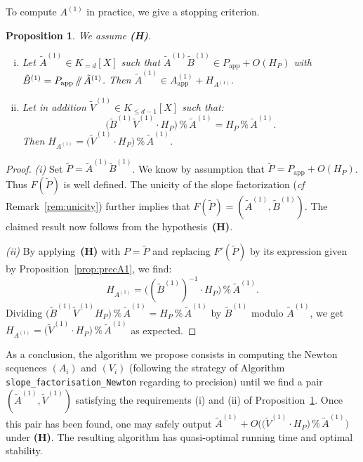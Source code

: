 \documentclass{sig-alternate-05-2015}
\renewcommand{\mod}{\,\%\,}
\renewcommand{\div}{\,/\hspace{-0.3em}/\,}
\newcommand{\app}{\textrm{app}}
\newtheorem{prop}[theo]{Proposition}
\theoremstyle{definition}
\begin{document}
To compute $A^{(1)}$ in practice, we give a stopping criterion.

\begin{prop}
\label{prop:stop}
We assume \textbf{(H)}. 

\vspace{-1mm}

\begin{enumerate}[(i)]
\item Let $\tilde A^{(1)} \in K_{=d}[X]$ such that
$\tilde A^{(1)} \tilde B^{(1)} \in P_\app + O(H_P)$ with
$\tilde B^{(1)} = P_\app \div \tilde A^{(1)}$.
Then $\tilde A^{(1)} \in A_\app^{(1)} + H_{A^{(1)}}$.
\vspace{-1mm}
\item Let in addition $\tilde V^{(1)} \in K_{\leq d{-}1}[X]$ such that:
$$\big(\tilde B^{(1)} \tilde V^{(1)} \cdot H_P\big) \mod \tilde A^{(1)}
= H_P \mod \tilde A^{(1)}.$$
Then $H_{A^{(1)}} = \big(\tilde V^{(1)} \cdot H_P\big) \mod \tilde A^{(1)}$.
\end{enumerate}
\end{prop}

\begin{proof}
\emph{(i)} 
Set $\tilde P = \tilde A^{(1)} \tilde B^{(1)}$. We know by assumption
that $\tilde P = P_\app + O(H_P)$. Thus $F(\tilde P)$ is well defined.
The unicity of the slope factorization (\emph{cf} 
Remark~\ref{rem:unicity}) further implies that $F(\tilde P) = 
(\tilde A^{(1)}, \tilde B^{(1)})$. The claimed result now follows from
the hypothesis~\textbf{(H)}.

\emph{(ii)} By applying~\textbf{(H)} with $P = \tilde P$ and replacing 
$F'(\tilde P)$ by its expression given by Proposition~\ref{prop:precA1}, 
we find:
$$H_{A^{(1)}} = \big((\tilde B^{(1)})^{-1} \cdot H_P\big) \mod \tilde A^{(1)}.$$
Dividing $\big(\tilde B^{(1)} \tilde V^{(1)} H_P\big) \mod \tilde 
A^{(1)} = H_P \mod \tilde A^{(1)}$ by $\tilde B^{(1)}$ modulo $\tilde
A^{(1)}$, we get
$H_{A^{(1)}} = \big(\tilde V^{(1)} \cdot H_P\big) \mod \tilde A^{(1)}$
as expected.
\end{proof}

As a conclusion, the algorithm we propose consists in computing the 
Newton sequences $(A_i)$ and $(V_i)$ (following the strategy of
Algorithm \texttt{slope\_factorisation\_Newton} regarding to precision)
until we find a pair $(\tilde A^{(1)}, \tilde V^{(1)})$ satisfying 
the requirements (i) and (ii) of Proposition~\ref{prop:stop}. Once this 
pair has been found, one may safely output $\tilde A^{(1)} + 
O\big(\big(\tilde V^{(1)} \cdot H_P\big) \mod \tilde A^{(1)}\big)$ under
\textbf{(H)}.
The resulting algorithm has quasi-optimal running 
time and optimal stability.
\end{document}
